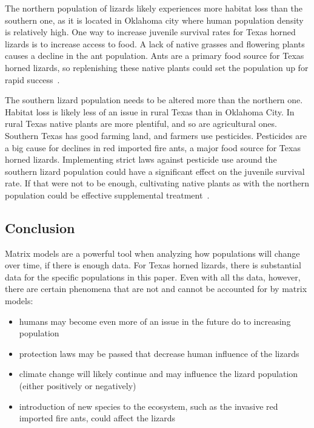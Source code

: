 \documentclass{article}
\begin{document}
    The northern population of lizards likely experiences more habitat loss than the southern one, as it is located in Oklahoma city where human population density is relatively high.
    One way to increase juvenile survival rates for Texas horned lizards is to increase access to food.
    A lack of native grasses and flowering plants causes a decline in the ant population.
    Ants are a primary food source for Texas horned lizards, so replenishing these native plants could set the population up for rapid success~\cite{pianka_horned_nodate}.

    The southern lizard population needs to be altered more than the northern one.
    Habitat loss is likely less of an issue in rural Texas than in Oklahoma City.
    In rural Texas native plants are more plentiful, and so are agricultural ones.
    Southern Texas has good farming land, and farmers use pesticides.
    Pesticides are a big cause for declines in red imported fire ants, a major food source for Texas horned lizards.
    Implementing strict laws against pesticide use around the southern lizard population could have a significant effect on the juvenile survival rate.
    If that were not to be enough, cultivating native plants as with the northern population could be effective supplemental treatment~\cite{pianka_horned_nodate}.


    \newpage
    \begin{center}
        \section{Conclusion}\label{sec:conclusion}
    \end{center}

    Matrix models are a powerful tool when analyzing how populations will change over time, if there is enough data.
    For Texas horned lizards, there is substantial data for the specific populations in this paper.
    Even with all ths data, however, there are certain phenomena that are not and cannot be accounted for by matrix models:
    \begin{itemize}
        \item humans may become even more of an issue in the future do to increasing population
        \item protection laws may be passed that decrease human influence of the lizards
        \item climate change will likely continue and may influence the lizard population (either positively or negatively)
        \item introduction of new species to the ecosystem, such as the invasive red imported fire ants, could affect the lizards
    \end{itemize}
\end{document}
